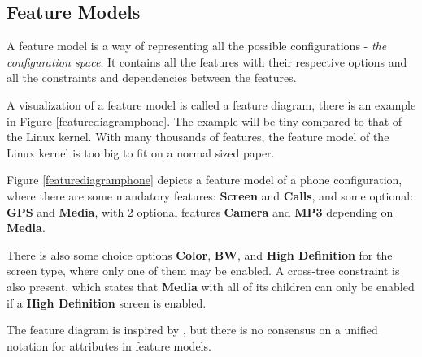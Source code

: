 \documentclass[a4paper,11pt]{report}
\begin{document}
        \subsection{Feature Models}

A feature model is a way of representing all the possible configurations - 
\emph{the configuration space}. It contains all the features with their 
respective options and all the constraints and dependencies between the features.

A visualization of a feature model is called a feature diagram, there is an 
example in Figure \ref{featurediagramphone}. The example will be tiny compared 
to that of the Linux kernel. With many thousands of features, the feature model 
of the Linux kernel is too big to fit on a normal sized paper.

Figure \ref{featurediagramphone} depicts a feature model of a phone 
configuration, where there are some mandatory features: \textbf{Screen} and 
\textbf{Calls}, and some optional: \textbf{GPS} and \textbf{Media}, with 2 
optional features \textbf{Camera} and \textbf{MP3} depending on \textbf{Media}.

There is also some choice options \textbf{Color}, \textbf{BW}, and \textbf{High 
Definition} for the screen type, where only one of them may be enabled. A 
cross-tree constraint is also present, which states that \textbf{Media} with 
all of its children can only be enabled if a \textbf{High Definition} screen is 
enabled.

The feature diagram is inspired by \cite{AAFM}, but there is no consensus on a 
unified notation for attributes in feature models\cite{AAFM}.
\end{document}
